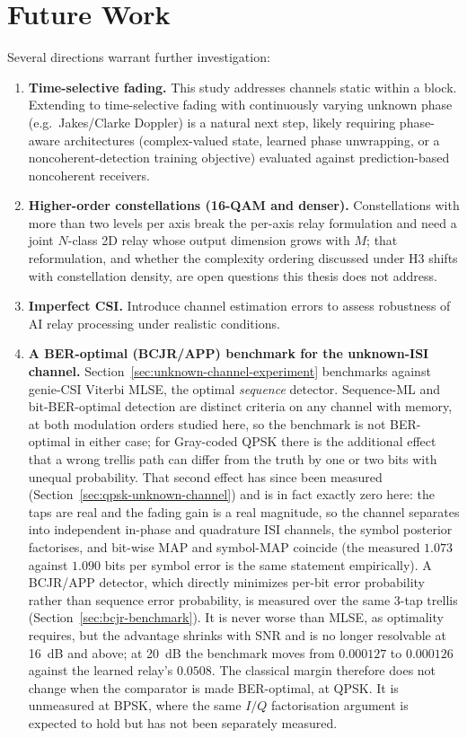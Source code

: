 \section{Future Work}\label{sec:future-work}

Several directions warrant further investigation:

\begin{enumerate}
\def\labelenumi{\arabic{enumi}.}
\item
  \textbf{Time-selective fading.} This study addresses channels static within a block. Extending to time-selective fading with continuously varying unknown phase (e.g.\ Jakes/Clarke Doppler) is a natural next step, likely requiring phase-aware architectures (complex-valued state, learned phase unwrapping, or a noncoherent-detection training objective) evaluated against prediction-based noncoherent receivers.
\item
  \textbf{Higher-order constellations (16-QAM and denser).} Constellations with more than two levels per axis break the per-axis relay formulation and need a joint $N$-class 2D relay whose output dimension grows with $M$; that reformulation, and whether the complexity ordering discussed under H3 shifts with constellation density, are open questions this thesis does not address.
\item
  \textbf{Imperfect CSI.} Introduce channel estimation errors to assess robustness of AI relay processing under realistic conditions.
\item
  \textbf{A BER-optimal (BCJR/APP) benchmark for the unknown-ISI channel.} Section~\ref{sec:unknown-channel-experiment} benchmarks against genie-CSI Viterbi MLSE, the optimal \emph{sequence} detector. Sequence-ML and bit-BER-optimal detection are distinct criteria on any channel with memory, at both modulation orders studied here, so the benchmark is not BER-optimal in either case; for Gray-coded QPSK there is the additional effect that a wrong trellis path can differ from the truth by one or two bits with unequal probability. That second effect has since been measured (Section~\ref{sec:qpsk-unknown-channel}) and is in fact exactly zero here: the taps are real and the fading gain is a real magnitude, so the channel separates into independent in-phase and quadrature ISI channels, the symbol posterior factorises, and bit-wise MAP and symbol-MAP coincide (the measured $1.073$ against $1.090$ bits per symbol error is the same statement empirically). A BCJR/APP detector, which directly minimizes per-bit error probability rather than sequence error probability, is measured over the same 3-tap trellis (Section~\ref{sec:bcjr-benchmark}). It is never worse than MLSE, as optimality requires, but the advantage shrinks with SNR and is no longer resolvable at 16~dB and above; at 20~dB the benchmark moves from $0.000127$ to $0.000126$ against the learned relay's $0.0508$. The classical margin therefore does not change when the comparator is made BER-optimal, at QPSK. It is unmeasured at BPSK, where the same $I/Q$ factorisation argument is expected to hold but has not been separately measured.

\end{enumerate}
